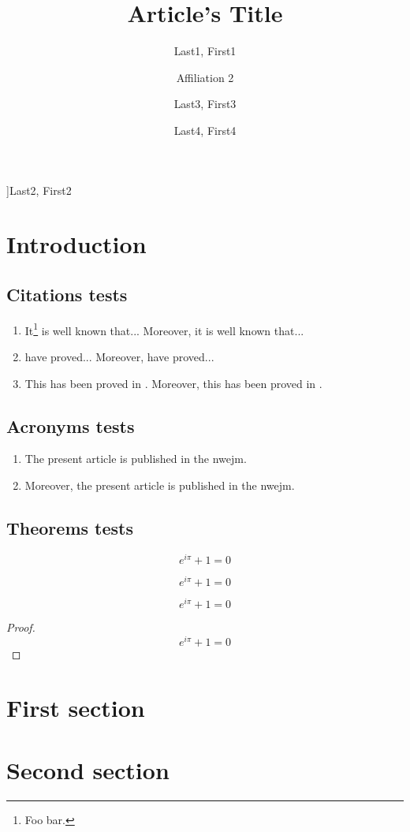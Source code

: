 \documentclass{nwejmart}
\newcommand{\formula}{%
  \begin{equation*}
    e^{i\pi}+1=0
  \end{equation*}
}
\begin{document}
\title{Article's Title}
\author[affiliation={Affiliation 1}]{Last1, First1}
\author[affiliation=[aff2]{Affiliation 2}]{Last2, First2}
\author[affiliation={Affiliation 3},affiliation={Affiliation 3 bis}]{Last3, First3}
\author[affiliation={Affiliation 4},affiliationtagged={aff2}]{Last4, First4}
%
%
\begin{abstract}
  \lipsum[1]
\end{abstract}
%
%
%
\maketitle
%
\section{Introduction}
%
\subsection{Citations tests}
%
\begin{enumerate}
\item It\footnote{Foo bar.} is well known\autocite{baez/article}
  that... Moreover, it is well known\autocite{companion} that...
\item \textcite{baez/article} have proved... Moreover, \textcite{companion}
  have proved...
\item This has been proved in \cite{baez/article}. Moreover, this has been
  proved in \cite{companion}.
\end{enumerate}
%
\subsection{Acronyms tests}
%
\begin{enumerate}
\item The present article is published in the \gls{nwejm}.
\item Moreover, the present article is published in the \gls{nwejm}.
\end{enumerate}
%
\subsection{Theorems tests}
%
\begin{theorem}
  \formula
\end{theorem}
\begin{remark}
  \formula
\end{remark}
\begin{corollary}
  \formula
\end{corollary}
\begin{proof}
  \formula
\end{proof}
%
\section{First section}
\lipsum[2-15]
\section{Second section}
\lipsum[16-38]
\printbibliography
%
\end{document}
